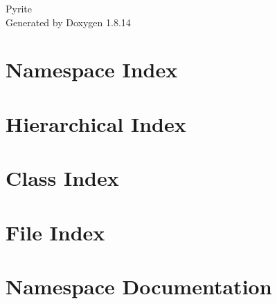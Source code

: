 \documentclass[twoside]{book}
\newcommand{\+}{\discretionary{\mbox{\scriptsize$\hookleftarrow$}}{}{}}
\newcommand{\clearemptydoublepage}{%
  \newpage{\pagestyle{empty}\cleardoublepage}%
}
\begin{document}
\hypersetup{pageanchor=false,
             bookmarksnumbered=true,
             pdfencoding=unicode
            }
\begin{titlepage}
\vspace*{7cm}
\begin{center}%
{\Large Pyrite }\\
\vspace*{1cm}
{\large Generated by Doxygen 1.8.14}\\
\end{center}
\end{titlepage}
\clearemptydoublepage
{}
\tableofcontents
\clearemptydoublepage
{}
\hypersetup{pageanchor=true}

\chapter{Namespace Index}

\chapter{Hierarchical Index}

\chapter{Class Index}

\chapter{File Index}

\chapter{Namespace Documentation}

\end{document}
